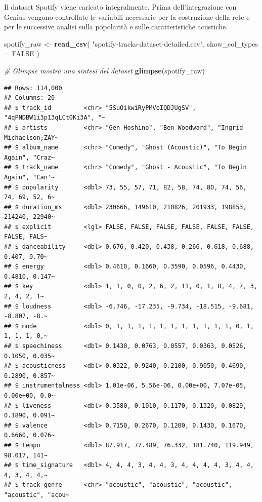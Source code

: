 \documentclass[
]{article}
\newenvironment{Shaded}{\begin{snugshade}}{\end{snugshade}}
\newcommand{\AttributeTok}[1]{\textcolor[rgb]{0.13,0.29,0.53}{#1}}
\newcommand{\CommentTok}[1]{\textcolor[rgb]{0.56,0.35,0.01}{\textit{#1}}}
\newcommand{\ConstantTok}[1]{\textcolor[rgb]{0.56,0.35,0.01}{#1}}
\newcommand{\FunctionTok}[1]{\textcolor[rgb]{0.13,0.29,0.53}{\textbf{#1}}}
\newcommand{\NormalTok}[1]{#1}
\newcommand{\OtherTok}[1]{\textcolor[rgb]{0.56,0.35,0.01}{#1}}
\newcommand{\StringTok}[1]{\textcolor[rgb]{0.31,0.60,0.02}{#1}}
\begin{document}
Il dataset Spotify viene caricato integralmente. Prima dell'integrazione
con Genius vengono controllate le variabili necessarie per la
costruzione della rete e per le successive analisi sulla popolarità e
sulle caratteristiche acustiche.

\begin{Shaded}
\begin{Highlighting}[]
\NormalTok{  spotify\_raw }\OtherTok{\textless{}{-}} \FunctionTok{read\_csv}\NormalTok{(}
    \StringTok{"spotify{-}tracks{-}dataset{-}detailed.csv"}\NormalTok{,}
    \AttributeTok{show\_col\_types =} \ConstantTok{FALSE}
\NormalTok{  )}
  
  \CommentTok{\# Glimpse mostra una sintesi del dataset}
  \FunctionTok{glimpse}\NormalTok{(spotify\_raw)}
\end{Highlighting}
\end{Shaded}

\begin{verbatim}
## Rows: 114,000
## Columns: 20
## $ track_id         <chr> "5SuOikwiRyPMVoIQDJUgSV", "4qPNDBW1i3p13qLCt0Ki3A", "~
## $ artists          <chr> "Gen Hoshino", "Ben Woodward", "Ingrid Michaelson;ZAY~
## $ album_name       <chr> "Comedy", "Ghost (Acoustic)", "To Begin Again", "Craz~
## $ track_name       <chr> "Comedy", "Ghost - Acoustic", "To Begin Again", "Can'~
## $ popularity       <dbl> 73, 55, 57, 71, 82, 58, 74, 80, 74, 56, 74, 69, 52, 6~
## $ duration_ms      <dbl> 230666, 149610, 210826, 201933, 198853, 214240, 22940~
## $ explicit         <lgl> FALSE, FALSE, FALSE, FALSE, FALSE, FALSE, FALSE, FALS~
## $ danceability     <dbl> 0.676, 0.420, 0.438, 0.266, 0.618, 0.688, 0.407, 0.70~
## $ energy           <dbl> 0.4610, 0.1660, 0.3590, 0.0596, 0.4430, 0.4810, 0.147~
## $ key              <dbl> 1, 1, 0, 0, 2, 6, 2, 11, 0, 1, 8, 4, 7, 3, 2, 4, 2, 1~
## $ loudness         <dbl> -6.746, -17.235, -9.734, -18.515, -9.681, -8.807, -8.~
## $ mode             <dbl> 0, 1, 1, 1, 1, 1, 1, 1, 1, 1, 1, 1, 0, 1, 1, 1, 1, 0,~
## $ speechiness      <dbl> 0.1430, 0.0763, 0.0557, 0.0363, 0.0526, 0.1050, 0.035~
## $ acousticness     <dbl> 0.0322, 0.9240, 0.2100, 0.9050, 0.4690, 0.2890, 0.857~
## $ instrumentalness <dbl> 1.01e-06, 5.56e-06, 0.00e+00, 7.07e-05, 0.00e+00, 0.0~
## $ liveness         <dbl> 0.3580, 0.1010, 0.1170, 0.1320, 0.0829, 0.1890, 0.091~
## $ valence          <dbl> 0.7150, 0.2670, 0.1200, 0.1430, 0.1670, 0.6660, 0.076~
## $ tempo            <dbl> 87.917, 77.489, 76.332, 181.740, 119.949, 98.017, 141~
## $ time_signature   <dbl> 4, 4, 4, 3, 4, 4, 3, 4, 4, 4, 4, 3, 4, 4, 4, 3, 4, 4,~
## $ track_genre      <chr> "acoustic", "acoustic", "acoustic", "acoustic", "acou~
\end{verbatim}
\end{document}
